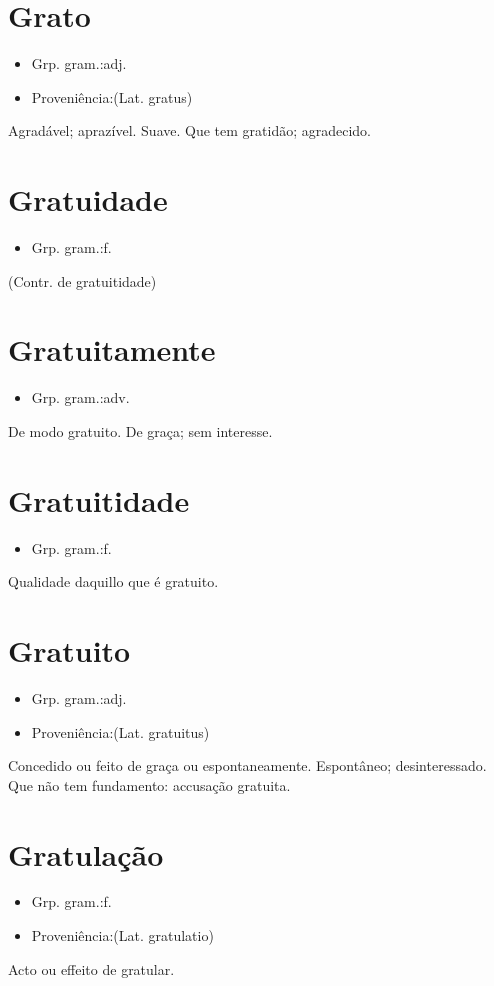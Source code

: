 \section{Grato}
\begin{itemize}
\item {Grp. gram.:adj.}
\end{itemize}
\begin{itemize}
\item {Proveniência:(Lat. \textunderscore gratus\textunderscore )}
\end{itemize}
Agradável; aprazível.
Suave.
Que tem gratidão; agradecido.
\section{Gratuidade}
\begin{itemize}
\item {Grp. gram.:f.}
\end{itemize}
(Contr. de \textunderscore gratuitidade\textunderscore )
\section{Gratuitamente}
\begin{itemize}
\item {Grp. gram.:adv.}
\end{itemize}
De modo gratuito.
De graça; sem interesse.
\section{Gratuitidade}
\begin{itemize}
\item {Grp. gram.:f.}
\end{itemize}
Qualidade daquillo que é gratuito.
\section{Gratuito}
\begin{itemize}
\item {Grp. gram.:adj.}
\end{itemize}
\begin{itemize}
\item {Proveniência:(Lat. \textunderscore gratuitus\textunderscore )}
\end{itemize}
Concedido ou feito de graça ou espontaneamente.
Espontâneo; desinteressado.
Que não tem fundamento: \textunderscore accusação gratuita\textunderscore .
\section{Gratulação}
\begin{itemize}
\item {Grp. gram.:f.}
\end{itemize}
\begin{itemize}
\item {Proveniência:(Lat. \textunderscore gratulatio\textunderscore )}
\end{itemize}
Acto ou effeito de gratular.
